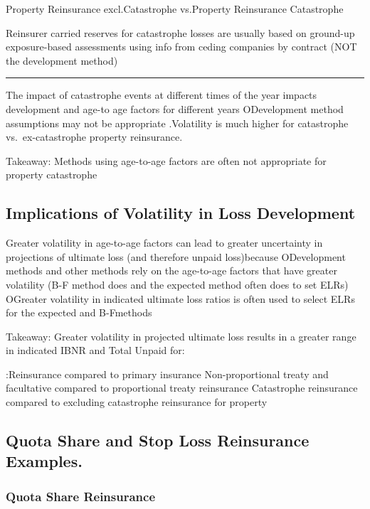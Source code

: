 \documentclass[
]{article}
\begin{document}
Property Reinsurance excl.Catastrophe vs.Property Reinsurance
Catastrophe

Reinsurer carried reserves for catastrophe losses are usually based on
ground-up exposure-based assessments using info from ceding companies by
contract (NOT the development method)

\begin{center}\rule{0.5\linewidth}{0.5pt}\end{center}

The impact of catastrophe events at different times of the year impacts
development and age-to age factors for different years ODevelopment
method assumptions may not be appropriate .Volatility is much higher for
catastrophe vs.~ex-catastrophe property reinsurance.

Takeaway: Methods using age-to-age factors are often not appropriate for
property catastrophe

\subsection{Implications of Volatility in Loss
Development}\label{implications-of-volatility-in-loss-development}

Greater volatility in age-to-age factors can lead to greater uncertainty
in projections of ultimate loss (and therefore unpaid loss)because
ODevelopment methods and other methods rely on the age-to-age factors
that have greater volatility (B-F method does and the expected method
often does to set ELRs) OGreater volatility in indicated ultimate loss
ratios is often used to select ELRs for the expected and B-Fmethods

Takeaway: Greater volatility in projected ultimate loss results in a
greater range in indicated IBNR and Total Unpaid for:

:Reinsurance compared to primary insurance Non-proportional treaty and
facultative compared to proportional treaty reinsurance Catastrophe
reinsurance compared to excluding catastrophe reinsurance for property

\subsection{Quota Share and Stop Loss Reinsurance
Examples.}\label{quota-share-and-stop-loss-reinsurance-examples.}

\subsubsection{Quota Share Reinsurance}\label{quota-share-reinsurance}
\end{document}
